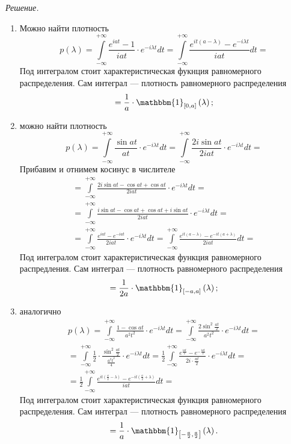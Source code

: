 \textit{Решение.}
\begin{enumerate}[label=\alph*)]
  \item Можно найти плотность
  $$p \left( \lambda \right) =
    \int \limits_{-\infty }^{+\infty } \frac{e^{iat} - 1}{iat} \cdot e^{-i \lambda t} dt =
    \int \limits_{-\infty }^{+\infty }
      \frac{e^{it \left( a - \lambda \right) } - e^{-i \lambda t}}{iat} dt =$$
  Под интегралом стоит характеристическая фукнция равномерного распределения.
  Сам интеграл --- плотность равномерного распределения
  $$= \frac{1}{a} \cdot \mathbbm{1}_{ \left[0, a \right] } \left( \lambda \right);$$
  \item можно найти плотность
  $$p \left( \lambda \right) =
    \int \limits_{-\infty }^{+\infty } \frac{ \sin at}{at} \cdot e^{-i \lambda t} dt =
    \int \limits_{-\infty }^{+\infty } \frac{2i \sin at}{2iat} \cdot e^{-i \lambda t} dt =$$
  Прибавим и отнимем косинус в числителе
  \begin{gather*}
    = \int \limits_{-\infty }^{+\infty }
      \frac{2i \sin at - \cos at + \cos at}{2iat} \cdot e^{-i \lambda t} dt = \\
    = \int \limits_{-\infty }^{+\infty }
      \frac{i \sin at - \cos at + \cos at + i \sin at}{2iat} \cdot e^{-i \lambda t} dt = \\
    = \int \limits_{-\infty }^{+\infty } \frac{e^{iat} - e^{-iat}}{2iat} \cdot e^{-i \lambda t} dt =
    \int \limits_{-\infty }^{+\infty }
      \frac{e^{it \left( a - \lambda \right) } - e^{-it \left( a + \lambda \right) }}{2iat} dt =
  \end{gather*}
  Под интегралом стоит характеристическая функция равномерного распредления.
  Сам интеграл --- плотность равномерного распределения
  $$= \frac{1}{2a} \cdot \mathbbm{1}_{ \left[ -a, a \right] } \left( \lambda \right);$$
  \item аналогично
  \begin{gather*}
    p \left( \lambda \right) =
    \int \limits_{-\infty }^{+\infty } \frac{1 - \cos at}{a^2 t^2} \cdot e^{-i \lambda t} dt =
    \int \limits_{-\infty }^{+\infty }
      \frac{2 \sin^2 \frac{at}{2}}{a^2 t^2} \cdot e^{-i \lambda t} dt = \\
    = \int \limits_{-\infty }^{+\infty }
      \frac{1}{2} \cdot \frac{ \sin^2 \frac{at}{2}}{ \frac{a^2 t^2}{4}} \cdot e^{-i \lambda t} dt =
    \frac{1}{2}
    \int \limits_{-\infty }^{+\infty }
      \frac{e^{ \frac{iat}{2}} - e^{-\frac{iat}{2}}}{2i \cdot \frac{at}{2}} \cdot e^{-i \lambda t}
    dt = \\
    = \frac{1}{2}
    \int \limits_{-\infty }^{+\infty }
      \frac{e^{it \left( \frac{a}{2} - \lambda \right) } - e^{-it \left( \frac{a}{2} + \lambda \right) }}{iat}
    dt =
  \end{gather*}
  Под интегралом стоит характеристическая функция равномерного распределения.
  Сам интеграл --- плотность равномерного распределения
  $$= \frac{1}{a} \cdot
    \mathbbm{1}_{ \left[ -\frac{a}{2}, \frac{a}{2} \right] } \left( \lambda \right).$$
\end{enumerate}

